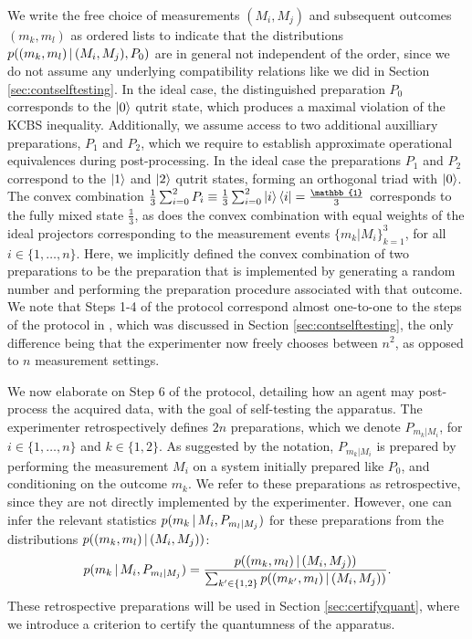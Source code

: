 We write the free choice of measurements $(M_i,M_j)$ and subsequent outcomes $(m_k,m_l)$ as ordered lists to indicate that the distributions $p((m_k,m_l)\thinspace\vert\thinspace (M_i,M_j),P_0)$ are in general not independent of the order, since we do not assume any underlying compatibility relations like we did in Section \ref{sec:contselftesting}. In the ideal case, the distinguished preparation $P_0$ corresponds to the $\ket{0}$ qutrit state, which produces a maximal violation of the KCBS inequality. Additionally, we assume access to two additional auxilliary preparations, $P_1$ and $P_2$, which we require to establish approximate operational equivalences during post-processing. In the ideal case the preparations $P_1$ and $P_2$ correspond to the $\ket{1}$ and $\ket{2}$ qutrit states, forming an orthogonal triad with $\ket{0}$. The convex combination $\frac{1}{3}\sum_{i=0}^2 P_i\equiv\frac{1}{3}\sum_{i=0}^2\ket{i}\bra{i}=\frac{\mathbb{1}}{3}$ corresponds to the fully mixed state $\frac{\mathbb{1}}{3}$, as does the convex combination with equal weights of the ideal projectors corresponding to the measurement events $\{m_k\vert M_i\}_{k=1}^3$, for all $i\in\{1,\dots,n\}$. Here, we implicitly defined the convex combination of two preparations to be the preparation that is implemented by generating a random number and performing the preparation procedure associated with that outcome. We note that Steps 1-4 of the protocol correspond almost one-to-one to the steps of the protocol in \cite{Bharti2019}, which was discussed in Section \ref{sec:contselftesting}, the only difference being that the experimenter now freely chooses between $n^2$, as opposed to $n$ measurement settings.

We now elaborate on Step 6 of the protocol, detailing how an agent may post-process the acquired data, with the goal of self-testing the apparatus. The experimenter retrospectively defines $2n$ preparations, which we denote $P_{m_k\vert M_i}$, for $i\in\{1,\dots,n\}$ and $k\in\{1,2\}$. As suggested by the notation, $P_{m_k\vert M_i}$ is prepared by performing the measurement $M_i$ on a system initially prepared like $P_0$, and conditioning on the outcome $m_k$. We refer to these preparations as retrospective, since they are not directly implemented by the experimenter. However, one can infer the relevant statistics $p(m_k\thinspace\vert\thinspace M_i, P_{m_l\vert M_j})$ for these preparations from the distributions $p((m_k,m_l)\thinspace\vert\thinspace (M_i,M_j))$:
\begin{equation*}
p(m_k\thinspace\vert\thinspace M_i, P_{m_l\vert M_j})=\frac{p((m_k,m_l)\thinspace\vert\thinspace (M_i,M_j))}{\sum_{k'\in\{1,2\}} p((m_{k'},m_l)\thinspace\vert\thinspace (M_i,M_j))}.
\end{equation*}
These retrospective preparations will be used in Section \ref{sec:certifyquant}, where we introduce a criterion to certify the quantumness of the apparatus.

